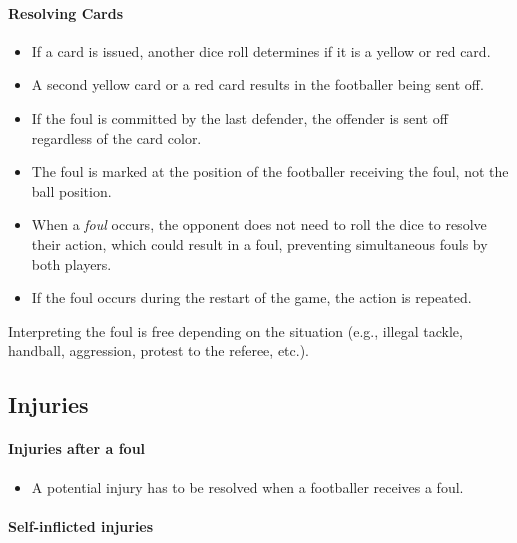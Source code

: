 \documentclass[12pt]{article}
\begin{document}
\paragraph{Resolving Cards}

\begin{rulebox}
\begin{itemize}
\item If a card is issued, another dice roll determines if it is a yellow or red card.
\item A second yellow card or a red card results in the footballer being sent off.
\item If the foul is committed by the last defender, the offender is sent off regardless of the card color.
\item The foul is marked at the position of the footballer receiving the foul, not the ball position.
\item When a \emph{foul} occurs, the opponent does not need to roll the dice to resolve their action, which could result in a foul, preventing simultaneous fouls by both players.
\item If the foul occurs during the restart of the game, the action is repeated.
\end{itemize}
\end{rulebox}

\begin{note}
Interpreting the foul is free depending on the situation (e.g., illegal tackle, handball, aggression, protest to the referee, etc.).
\end{note}

\subsection{Injuries}

\paragraph{Injuries after a foul}

\begin{rulebox}
\begin{itemize}
\item A potential injury has to be resolved when a footballer receives a foul.
\end{itemize}
\end{rulebox}

\paragraph{Self-inflicted injuries}
\end{document}

